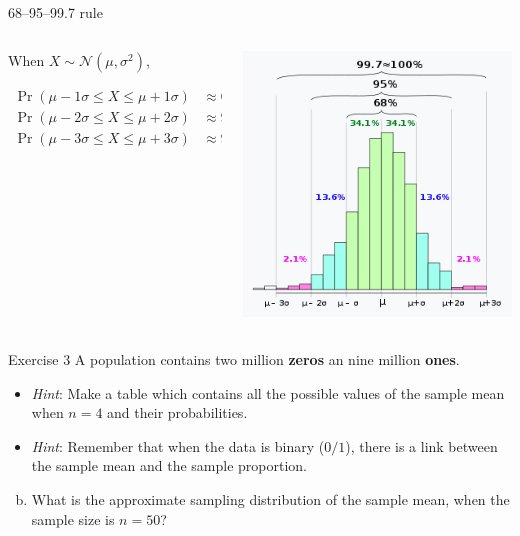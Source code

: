 \documentclass[
  11pt,
  ignorenonframetext,
]{beamer}
\providecommand{\tightlist}{%
  \setlength{\itemsep}{0pt}\setlength{\parskip}{0pt}}
\begin{document}
\begin{frame}{68--95--99.7 rule}
\protect\hypertarget{rule}{}
\begin{columns}[T]
\begin{column}{.5\textwidth}
When \(X \sim \mathcal{N}(\mu, \sigma^2)\),

\[
\begin{aligned}
\Pr(\mu -1\sigma \leq X\leq \mu +1\sigma )&\approx 68.27\%\\
\Pr(\mu -2\sigma \leq X\leq \mu +2\sigma )&\approx 95.45\%\\
\Pr(\mu -3\sigma \leq X\leq \mu +3\sigma )&\approx 99.73\%
\end{aligned}
\]
\end{column}

\begin{column}{0.48\textwidth}
\begin{center}\includegraphics[width=0.8\linewidth]{pictures/68-95-99.7_RULE} \end{center}
\end{column}
\end{columns}
\end{frame}

\begin{frame}{Exercise 3}
\protect\hypertarget{exercise-3}{}
A population contains two million \textbf{zeros} an nine million
\textbf{ones}.

\begin{itemize}
\item
  \emph{Hint}: Make a table which contains all the possible values of
  the sample mean when \(n = 4\) and their probabilities.
\item
  \emph{Hint}: Remember that when the data is binary (\(0/1\)), there is
  a link between the sample mean and the sample proportion.
\end{itemize}

\begin{enumerate}
[(a)]
\setcounter{enumi}{1}
\tightlist
\item
  What is the approximate sampling distribution of the sample mean, when
  the sample size is \(n = 50\)?
\end{enumerate}
\end{frame}
\end{document}

